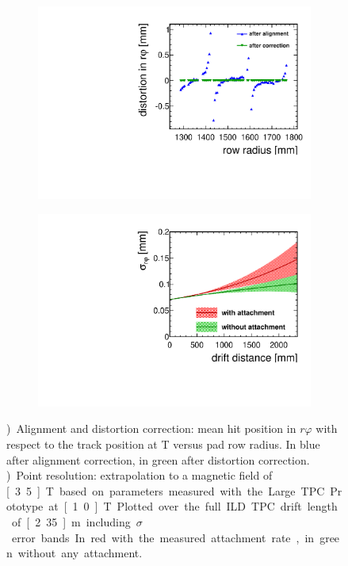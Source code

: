 \begin{figure}[htb!]
\begin{subfigure}[b]{0.48\textwidth}
\includegraphics[width=\textwidth]{Tracker/TPC_Bonn/plots/TPC-DG_distortionAlignmentPaper1Tdistcor.pdf}
\caption{}
\label{sfig:1Tdistort}
\end{subfigure}
\begin{subfigure}[b]{0.48\textwidth}
\includegraphics[width=\textwidth]{Tracker/TPC_Bonn/plots/TPC-DG_xyResolutionExtrapolated.pdf}
\caption{}
\label{sfig:resextrapol}
\end{subfigure}
\caption{\small \protect{})~Alignment and distortion correction: mean hit position in $r\varphi$ with respect to the track position at \unit[1]{T} versus pad row radius. In blue after alignment correction, in green after distortion correction. \protect{})~Point resolution: extrapolation to a magnetic field of \unit[3.5]{T} based on parameters measured with the Large TPC Prototype at \unit[1.0]{T}. Plotted over the full ILD TPC drift length of \unit[2.35]{m} including \unit[1]{$\sigma$} error bands. In red with the measured attachment rate, in green without any attachment.}
\label{fig:align1Tdistort}
\end{figure}

